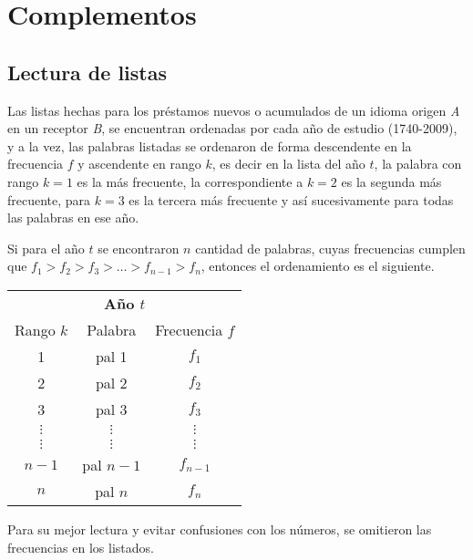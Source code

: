 \chapter{Complementos}

\section{Lectura de listas}
\label{lectura.listas}
 
Las listas hechas para los préstamos nuevos \cite{prestamos_nuevos} o acumulados \cite{prestamos_acumulados} de un idioma origen \textit{A} en un receptor \textit{B},  se encuentran ordenadas por cada año de estudio (1740-2009), y a la vez, las palabras listadas se ordenaron de forma descendente en la frecuencia $f$ y ascendente en rango $k$,  es decir en la lista del año $t$, la palabra con rango $k=1$ es la más frecuente,  la correspondiente a $k=2$ es la segunda más frecuente, para $k=3$ es la tercera más frecuente y así sucesivamente para todas las palabras en ese año. 


Si para el año $t$  se encontraron $n$ cantidad de palabras, cuyas frecuencias cumplen que $f_{1} > f_{2} > f_{3} >  \dots > f_{n-1} > f_{n}$,  entonces el ordenamiento es el siguiente. 

\begin{table}[h!]
	\centering
	\begin{tabular}{ccc}
		\multicolumn{3}{c}{\textbf{Año $t$}}        \\
		Rango $k$     & Palabra    & Frecuencia $f$    \\
		1             & pal 1      & $f_{1}$            \\
		2             & pal 2      & $f_{2}$             \\
		3             & pal 3      & $f_{3}$              \\
		$\vdots$      & $\vdots$   & $\vdots$         \\
		$\vdots$      & $\vdots$   & $\vdots$         \\
		$n-1$         & pal $n-1$  & $f_{n-1}$             \\
		$n$           & pal $n$    & $f_{n}$          
	\end{tabular}
\end{table}


Para su mejor lectura y evitar confusiones con los números,  se omitieron las frecuencias en los listados. 








